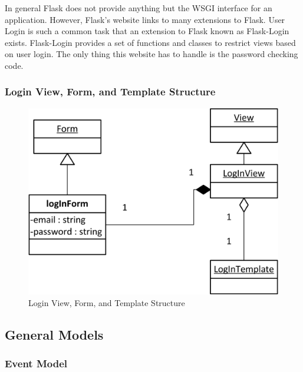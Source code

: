 \documentclass{article}
\begin{document}
In general Flask does not provide anything but the WSGI interface for an application. However, Flask's website links to many
extensions to Flask. User Login is such a common task that an extension to Flask known as Flask-Login exists. \cite{_flask-login} Flask-Login provides a set of functions and classes to restrict views based on user login. The only thing this website has to handle is the password checking code.

\subsubsection{Login View, Form, and Template Structure}
\FloatBarrier
\begin{figure}[h!]
\centering
\includegraphics[scale=.65]{img/viewFormTemplateDiagrams/logIn}
\caption{Login View, Form, and Template Structure}
\label{fig:loginViewFormTemplateStructureDiagram}
\end{figure}
\FloatBarrier

\subsection{General Models}

\subsubsection{Event Model}
\end{document}
